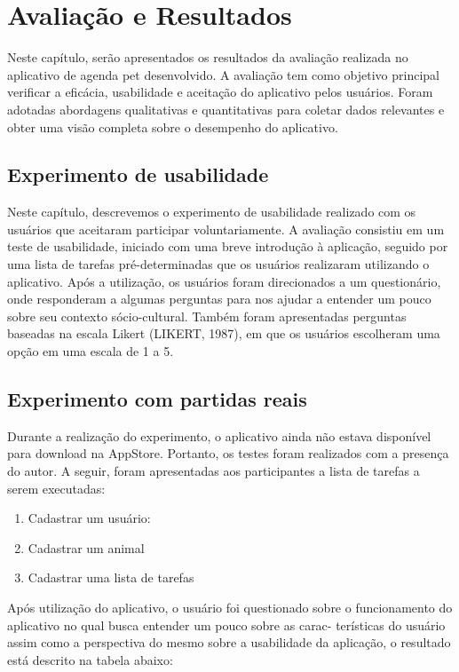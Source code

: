 \chapter[Avaliação e Resultados]{Avaliação e Resultados}

Neste capítulo, serão apresentados os resultados da avaliação realizada no aplicativo de agenda pet desenvolvido. A avaliação tem como objetivo principal verificar a eficácia, usabilidade e aceitação do aplicativo pelos usuários. Foram adotadas abordagens qualitativas e quantitativas para coletar dados relevantes e obter uma visão completa sobre o desempenho do aplicativo.

\section{Experimento de usabilidade}

Neste capítulo, descrevemos o experimento de usabilidade realizado com os usuários que aceitaram participar voluntariamente. A avaliação consistiu em um teste de usabilidade, iniciado com uma breve introdução à aplicação, seguido por uma lista de tarefas pré-determinadas que os usuários realizaram utilizando o aplicativo. Após a utilização, os usuários foram direcionados a um questionário, onde responderam a algumas perguntas para nos ajudar a entender um pouco sobre seu contexto sócio-cultural. Também foram apresentadas perguntas baseadas na escala Likert (LIKERT, 1987), em que os usuários escolheram uma opção em uma escala de 1 a 5.



\section{Experimento com partidas reais}

Durante a realização do experimento, o aplicativo ainda não estava disponível para download na AppStore. Portanto, os testes foram realizados com a presença do autor. A seguir, foram apresentadas aos participantes a lista de tarefas a serem executadas:

\begin{enumerate}[label*=\arabic*.]
    \item Cadastrar um usuário:
    \item Cadastrar um animal
    \item Cadastrar uma lista de tarefas
\end{enumerate} 


Após utilização do aplicativo, o usuário foi questionado sobre o funcionamento do aplicativo no qual busca entender um pouco sobre as carac-
terísticas do usuário assim como a perspectiva do mesmo sobre a usabilidade da aplicação, o resultado está descrito na tabela abaixo:

